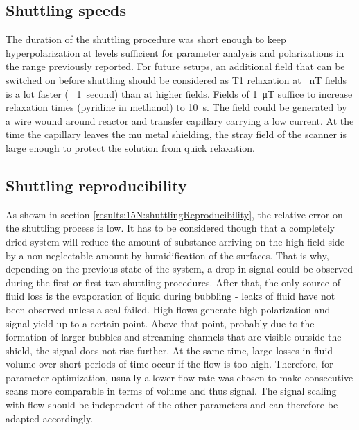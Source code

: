         \subsection{Shuttling speeds}
        The duration of the shuttling procedure was short enough to keep hyperpolarization at levels sufficient for parameter analysis and polarizations in the range previously reported. For future setups, an additional field that can be switched on before shuttling should be considered as T1 relaxation at \SI{}{\nano\tesla} fields is a lot faster (~ \SI{1}{second}) than at higher fields. Fields of \SI{1}{\micro\tesla} suffice to increase relaxation times (pyridine in methanol) to  \SI{10}{\second}. The field could be generated by a wire wound around reactor and transfer capillary carrying a low current. At the time the capillary leaves the mu metal shielding, the stray field of the scanner is large enough to protect the solution from quick relaxation.
        \subsection{Shuttling reproducibility}
            As shown in section \ref{results:15N:shuttlingReproducibility}, the relative error on the shuttling process is low. It has to be considered though that a completely dried system will reduce the amount of substance arriving on the high field side by a non neglectable amount by humidification of the surfaces. That is why, depending on the previous state of the system, a drop in signal could be observed during the first or first two shuttling procedures. After that, the only source of fluid loss is the evaporation of liquid during bubbling - leaks of fluid have not been observed unless a seal failed. High flows generate high polarization  and signal yield up to a certain point. Above that point, probably due to the formation of larger bubbles and streaming channels that are visible outside the shield, the signal does not rise further. At the same time, large losses in fluid volume over short periods of time occur if the flow is too high. Therefore, for parameter optimization, usually  a lower flow rate was chosen to make consecutive scans more comparable in terms of volume and thus signal. The signal scaling with flow should be independent of the other parameters and can therefore be adapted accordingly.
